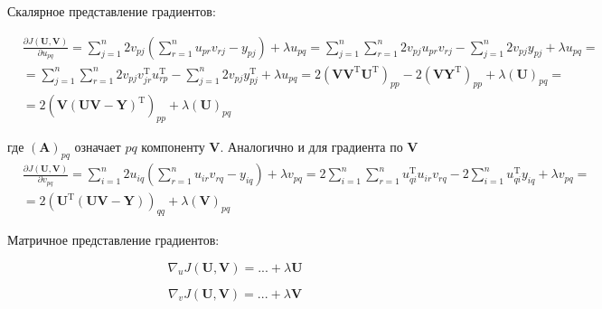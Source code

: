 	Скалярное представление градиентов:
	
	\begin{equation}
	\begin{split}
	&\frac{\partial J(\mathbf{U}, \mathbf{V})}{\partial u_{pq}} =
	\sum\limits_{j=1}^{n}2v_{pj} (\sum\limits_{r=1}^{n}u_{pr}v_{rj}-y_{pj}) +
	\lambda u_{pq} =\sum\limits_{j=1}^{n} \sum\limits_{r=1}^{n} 2v_{pj}
	u_{pr}v_{rj}-\sum\limits_{j=1}^{n} 2v_{pj} y_{pj} + \lambda u_{pq}= \\
	&=\sum\limits_{j=1}^{n} \sum\limits_{r=1}^{n} 2v_{pj}v_{jr}^\text{T}
	u_{rp}^\text{T}-\sum\limits_{j=1}^{n} 2v_{pj} y_{pj}^\text{T} + \lambda u_{pq} =
	2(\mathbf{V}\mathbf{V}^\text{T}\mathbf{U}^\text{T})_{pp} -
	2(\mathbf{V}\mathbf{Y}^\text{T})_{pp} + \lambda (\mathbf{U})_{pq}= \\
	&= 2 (\mathbf{V} (\mathbf{U}\mathbf{V} - \mathbf{Y})^\text{T})_{pp} + \lambda
	(\mathbf{U})_{pq} 
	\end{split}
	\end{equation}
	
	где $(\mathbf{A})_{pq}$ означает $pq$ компоненту $\mathbf{V}$. Аналогично и для
	градиента по $\mathbf{V}$
	\begin{equation}
	\begin{split}
	&\frac{\partial J(\mathbf{U}, \mathbf{V})}{\partial v_{pq}} =
	\sum\limits_{i=1}^{n}2u_{iq} (\sum\limits_{r=1}^{n}u_{ir}v_{rq}-y_{iq}) +
	\lambda v_{pq} = 2\sum\limits_{i=1}^{n} \sum\limits_{r=1}^{n} u_{qi}^\text{T}
	u_{ir}v_{rq}- 2\sum\limits_{i=1}^{n} u_{qi}^\text{T} y_{iq} + \lambda v_{pq} =
	\\
	&= 2 (\mathbf{U}^\text{T} (\mathbf{U}\mathbf{V} - \mathbf{Y}))_{qq} + \lambda
	(\mathbf{V})_{pq}  
	\end{split}
	\end{equation}
	
	Матричное представление градиентов:
	
	
	\begin{equation}
	\nabla_u J(\mathbf{U}, \mathbf{V}) = ... + \lambda \mathbf{U}
	\end{equation}
	
	
	\begin{equation}
	\nabla_v J(\mathbf{U}, \mathbf{V}) = ...+ \lambda \mathbf{V}
	\end{equation}
	
	\subsection{}
	
